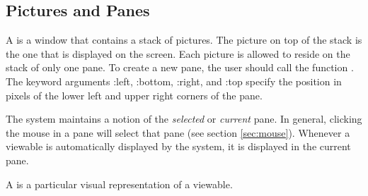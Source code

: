
\subsection{Pictures and Panes}
\label{sec:pictures}

A  is a window that contains a stack of pictures.  The
picture on top of the stack is the one that is displayed on the
screen.  Each picture is allowed to reside on the stack of only one
pane.  To create a new pane, the user should call the function 
. The keyword arguments :left, :bottom, :right, and :top
specify the position in pixels of the lower left and upper right
corners of the pane.

The system maintains a notion of the {\em selected} or {\em current}
pane.  In general, clicking the mouse in a pane will select that pane
(see section \ref{sec:mouse}).  Whenever a viewable is automatically
displayed by the system, it is displayed in the current pane.

A  is a particular visual representation of a viewable.

